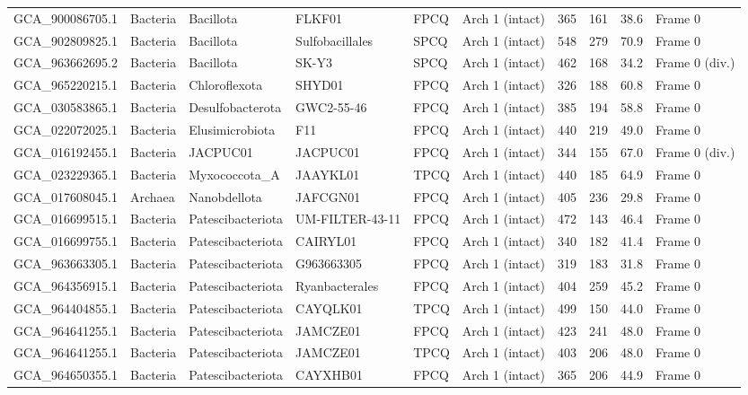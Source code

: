 \documentclass[10pt,letterpaper]{article}
\begin{document}
{\begin{longtable}{@{}llllllllll@{}}
GCA\_900086705.1 & Bacteria & Bacillota & FLKF01 & FPCQ & Arch 1 (intact) & 365 & 161 & 38.6 & Frame 0 \\
GCA\_902809825.1 & Bacteria & Bacillota & Sulfobacillales & SPCQ & Arch 1 (intact) & 548 & 279 & 70.9 & Frame 0 \\
GCA\_963662695.2 & Bacteria & Bacillota & SK-Y3 & SPCQ & Arch 1 (intact) & 462 & 168 & 34.2 & Frame 0 (div.) \\
GCA\_965220215.1 & Bacteria & Chloroflexota & SHYD01 & FPCQ & Arch 1 (intact) & 326 & 188 & 60.8 & Frame 0 \\
GCA\_030583865.1 & Bacteria & Desulfobacterota & GWC2-55-46 & FPCQ & Arch 1 (intact) & 385 & 194 & 58.8 & Frame 0 \\
GCA\_022072025.1 & Bacteria & Elusimicrobiota & F11 & FPCQ & Arch 1 (intact) & 440 & 219 & 49.0 & Frame 0 \\
GCA\_016192455.1 & Bacteria & JACPUC01 & JACPUC01 & FPCQ & Arch 1 (intact) & 344 & 155 & 67.0 & Frame 0 (div.) \\
GCA\_023229365.1 & Bacteria & Myxococcota\_A & JAAYKL01 & TPCQ & Arch 1 (intact) & 440 & 185 & 64.9 & Frame 0 \\
GCA\_017608045.1 & Archaea & Nanobdellota & JAFCGN01 & FPCQ & Arch 1 (intact) & 405 & 236 & 29.8 & Frame 0 \\
GCA\_016699515.1 & Bacteria & Patescibacteriota & UM-FILTER-43-11 & FPCQ & Arch 1 (intact) & 472 & 143 & 46.4 & Frame 0 \\
GCA\_016699755.1 & Bacteria & Patescibacteriota & CAIRYL01 & FPCQ & Arch 1 (intact) & 340 & 182 & 41.4 & Frame 0 \\
GCA\_963663305.1 & Bacteria & Patescibacteriota & G963663305 & FPCQ & Arch 1 (intact) & 319 & 183 & 31.8 & Frame 0 \\
GCA\_964356915.1 & Bacteria & Patescibacteriota & Ryanbacterales & FPCQ & Arch 1 (intact) & 404 & 259 & 45.2 & Frame 0 \\
GCA\_964404855.1 & Bacteria & Patescibacteriota & CAYQLK01 & TPCQ & Arch 1 (intact) & 499 & 150 & 44.0 & Frame 0 \\
GCA\_964641255.1 & Bacteria & Patescibacteriota & JAMCZE01 & FPCQ & Arch 1 (intact) & 423 & 241 & 48.0 & Frame 0 \\
GCA\_964641255.1 & Bacteria & Patescibacteriota & JAMCZE01 & TPCQ & Arch 1 (intact) & 403 & 206 & 48.0 & Frame 0 \\
GCA\_964650355.1 & Bacteria & Patescibacteriota & CAYXHB01 & FPCQ & Arch 1 (intact) & 365 & 206 & 44.9 & Frame 0 \\

\end{longtable}}
\end{document}
